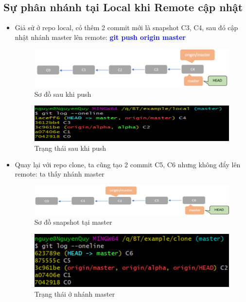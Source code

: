 \documentclass[12pt,a4paper]{report}
\begin{document}
\subsection{Sự phân nhánh tại Local khi Remote cập nhật} 
\begin{itemize}
\item Giả sử ở repo local, có thêm 2 commit mới là snapshot C3, C4, sau đó cập nhật nhánh master lên remote: \textcolor{blue}{\bf git push origin master}

\begin{figure}[!ht]
	\centering
 	\includegraphics[width=0.8\linewidth]{screenshot069}
\caption{Sơ đồ sau khi push}
 	\label{fig:screenshot069}
\end{figure}

\begin{figure}[!ht]
	\centering
 	\includegraphics[width=0.8\linewidth]{screenshot070}
 \caption{Trạng thái sau khi push}
 	\label{fig:screenshot070}
 	\end{figure}
 	
\item Quay lại với repo clone, ta cũng tạo 2 commit C5, C6 nhưng không đẩy lên remote: ta thấy nhánh master 
 
\begin{figure}[!ht]
	\centering
 	\includegraphics[width=0.8\linewidth]{screenshot071}
 \caption{Sơ đồ snapshot tại master}
 	\label{fig:screenshot071}
 	\end{figure}
 
\begin{figure}[!ht]
	\centering 
 	\includegraphics[width=0.8\linewidth]{screenshot072}
 \caption{Trạng thái ở nhánh master}
 	\label{fig:screenshot072}
 	\end{figure}


\end{itemize}
\end{document}

